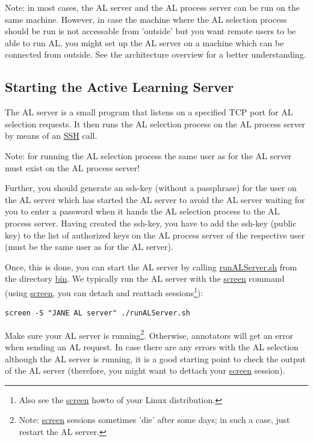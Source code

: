 \documentclass[DIV12,english,11pt,halfparskip]{scrartcl}
\begin{document}
Note: in most cases, the AL server and the AL process server can be
run on the same machine. However, in case the machine where the AL
selection process should be run is not accessable from 'outside' but
you want remote users to be able to run AL, you might set up the AL
server on a machine which can be connected from outside. See the
architecture overview for a better understanding.


\subsection{Starting the Active Learning Server}
The AL server is a small program that listens on a specified TCP port
for AL selection requests. It then runs the AL selection process on
the AL process server by means of an \url{SSH} call. 

Note: for running the AL selection process the same user as for the AL
server must exist on the AL process server!

Further, you should generate an ssh-key (without a passphrase) for the
user on the AL server which has started the AL server to avoid the AL
server waiting for you to enter a password when it hands the AL
selection process to the AL process server. Having created the ssh-key,
you have to add the ssh-key (public key) to the list of authorized
keys on the AL process server of the respective user (must be the same
user as for the AL server).

Once, this is done, you can start the AL server by calling
\url{runALServer.sh} from the directory \url{bin}. We typically run
the AL server with the \url{screen} command (using \url{screen}, you
can detach and reattach sessions\footnote{Also see the \url{screen}
  howto of your Linux distribution.}):

\begin{verbatim}
screen -S "JANE AL server" ./runALServer.sh
\end{verbatim}

Make sure your AL server is running\footnote{Note: \url{screen}
  sessions sometimes 'die' after some days; in such a case, just
  restart the AL server.}. Otherwise, annotators will get an error when
sending an AL request. In case there are any errors with the AL
selection although the AL server is running, it is a good starting
point to check the output of the AL server (therefore, you might want
to dettach your \url{screen} session).
\end{document}

